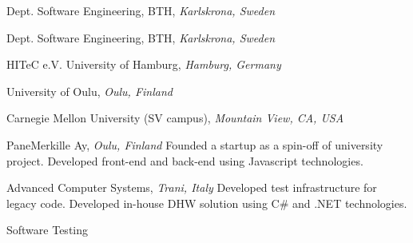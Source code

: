 \documentclass[9pt]{article}
\begin{document}
\noindent Dept. Software Engineering, BTH, \emph{Karlskrona, Sweden} \vspace{0.01in} 
\newline{}
\bigskip

\noindent Dept. Software Engineering, BTH, \emph{Karlskrona, Sweden} \vspace{0.01in} 
\newline{}
\bigskip

\noindent HITeC e.V. \amper{} University of Hamburg, \emph{Hamburg, Germany} \vspace{0.01in} 
\newline{}
\bigskip

\noindent University of Oulu, \emph{Oulu, Finland} \vspace{0.01in} 
\newline{}
\bigskip

\noindent Carnegie Mellon University (SV campus), \emph{Mountain View, CA, USA} \vspace{0.01in}  
\newline{}
\bigskip

\noindent PaneMerkille Ay, \emph{Oulu, Finland} \vspace{0.01in} 
\newline{}
\newline\noindent Founded a startup as a spin-off of university project.
\newline\noindent Developed front-end and back-end using Javascript technologies.
\bigskip

\noindent Advanced Computer Systems, \emph{Trani, Italy} \vspace{0.01in} 
\newline{}
\newline\noindent Developed test infrastructure for legacy code.
\newline\noindent Developed in-house DHW solution using C\# and .NET technologies.
\bigskip

  
\newline\noindent Software Testing 
\bigskip
\end{document}
